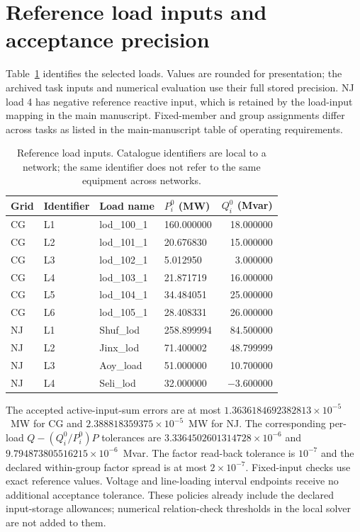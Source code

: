 
\section{Reference load inputs and acceptance precision}
\label{app:catalogue}

Table~\ref{tab:load-catalogue} identifies the selected loads. Values are rounded for presentation; the archived task inputs and numerical evaluation use their full stored precision. NJ load 4 has negative reference reactive input, which is retained by the load-input mapping in the main manuscript. Fixed-member and group assignments differ across tasks as listed in the main-manuscript table of operating requirements.

\begin{table}[H]
\caption{Reference load inputs. Catalogue identifiers are local to a network; the same identifier does not refer to the same equipment across networks.}
\label{tab:load-catalogue}
\small
\begin{tabular}{@{}llllr@{}}
\toprule
Grid & Identifier & Load name & $P_i^0$ (MW) & $Q_i^0$ (Mvar) \\
\midrule
CG & L1 & lod\_100\_1 & 160.000000 & 18.000000 \\
CG & L2 & lod\_101\_1 & 20.676830 & 15.000000 \\
CG & L3 & lod\_102\_1 & 5.012950 & 3.000000 \\
CG & L4 & lod\_103\_1 & 21.871719 & 16.000000 \\
CG & L5 & lod\_104\_1 & 34.484051 & 25.000000 \\
CG & L6 & lod\_105\_1 & 28.408331 & 26.000000 \\
NJ & L1 & Shuf\_lod & 258.899994 & 84.500000 \\
NJ & L2 & Jinx\_lod & 71.400002 & 48.799999 \\
NJ & L3 & Aoy\_load & 51.000000 & 10.700000 \\
NJ & L4 & Seli\_lod & 32.000000 & $-3.600000$ \\
\bottomrule
\end{tabular}
\end{table}

The accepted active-input-sum errors are at most $1.3636184692382813\times10^{-5}$~MW for CG and $2.388818359375\times10^{-5}$~MW for NJ. The corresponding per-load $Q-(Q_i^0/P_i^0)P$ tolerances are $3.3364502601314728\times10^{-6}$ and $9.794873805516215\times10^{-6}$~Mvar. The factor read-back tolerance is $10^{-7}$ and the declared within-group factor spread is at most $2\times10^{-7}$. Fixed-input checks use exact reference values. Voltage and line-loading interval endpoints receive no additional acceptance tolerance. These policies already include the declared input-storage allowances; numerical relation-check thresholds in the local solver are not added to them.

